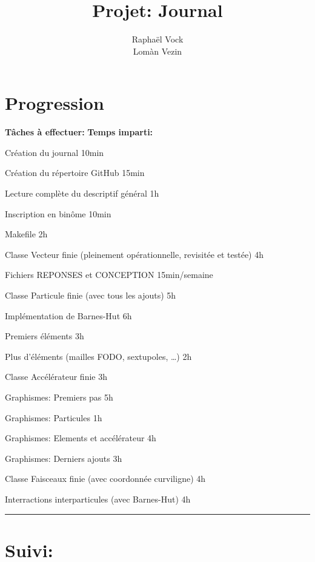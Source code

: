 \documentclass[12pt, letterpaper, twoside]{article}
\title{Projet: Journal}
\author{Raphaël Vock \\ Lomàn Vezin}
\newcommand{\cmark}{\ding{51}}%
\newcommand{\done}{\rlap{$\square$}{\raisebox{2pt}{\large\hspace{1pt}\cmark}}%
\hspace{-2.5pt}}
\begin{document}
\maketitle

\section{Progression}

\textbf{Tâches à effectuer:} \hfill \textbf{Temps imparti:}
\ \linebreak

\begin{todolist}
	\item[\done] Création du journal \hfill 10min
	\item[\done] Création du répertoire GitHub \hfill 15min
	\item[\done] Lecture complète du descriptif général \hfill 1h
	\item[\done] Inscription en binôme \hfill 10min
	\item[\done] Makefile \hfill 2h
	\item[\done] Classe Vecteur finie (pleinement opérationnelle, revisitée et testée) \hfill 4h
	\item[\done] Fichiers REPONSES et CONCEPTION \hfill 15min/semaine
	\item[\done] Classe Particule finie (avec tous les ajouts) \hfill 5h
	\item[\done] Implémentation de Barnes-Hut \hfill 6h
	\item[\done] Premiers éléments \hfill 3h
	\item[\done] Plus d'éléments (mailles FODO, sextupoles, \ldots) \hfill 2h
	\item[\done] Classe Accélérateur finie \hfill 3h
	\item[\done] Graphismes: Premiers pas \hfill 5h
	\item[\done] Graphismes: Particules \hfill 1h
	\item[\done] Graphismes: Elements et accélérateur \hfill 4h
	\item[\done] Graphismes: Derniers ajouts \hfill 3h
	\item[\done] Classe Faisceaux finie (avec coordonnée curviligne) \hfill 4h
	\item[\done] Interractions interparticules (avec Barnes-Hut) \hfill 4h
\end{todolist}

\rule{\textwidth}{0.4pt}

\section{Suivi:}
\end{document}
